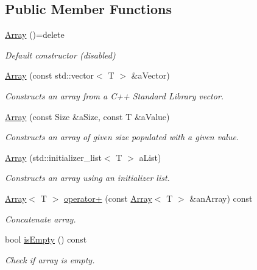 \subsection*{Public Member Functions}
\begin{DoxyCompactItemize}
\item 
\hyperlink{classlibrary_1_1core_1_1ctnr_1_1_array_a95de936b24bfdf0a5d24ef45df892ecf}{Array} ()=delete
\begin{DoxyCompactList}\small\item\em Default constructor (disabled) \end{DoxyCompactList}\item 
\hyperlink{classlibrary_1_1core_1_1ctnr_1_1_array_a9b510b4e2a3f9d4a324dfd0feba01285}{Array} (const std\+::vector$<$ T $>$ \&a\+Vector)
\begin{DoxyCompactList}\small\item\em Constructs an array from a C++ Standard Library vector. \end{DoxyCompactList}\item 
\hyperlink{classlibrary_1_1core_1_1ctnr_1_1_array_a647190cec3e259a8d8ad173c18bf3020}{Array} (const Size \&a\+Size, const T \&a\+Value)
\begin{DoxyCompactList}\small\item\em Constructs an array of given size populated with a given value. \end{DoxyCompactList}\item 
\hyperlink{classlibrary_1_1core_1_1ctnr_1_1_array_adcda1d4d28575b580a978406107febbb}{Array} (std\+::initializer\+\_\+list$<$ T $>$ a\+List)
\begin{DoxyCompactList}\small\item\em Constructs an array using an initializer list. \end{DoxyCompactList}\item 
\hyperlink{classlibrary_1_1core_1_1ctnr_1_1_array}{Array}$<$ T $>$ \hyperlink{classlibrary_1_1core_1_1ctnr_1_1_array_a5d65732e2a07b268d9def2da3c955002}{operator+} (const \hyperlink{classlibrary_1_1core_1_1ctnr_1_1_array}{Array}$<$ T $>$ \&an\+Array) const
\begin{DoxyCompactList}\small\item\em Concatenate array. \end{DoxyCompactList}\item 
bool \hyperlink{classlibrary_1_1core_1_1ctnr_1_1_array_a77d943be46a6d0313be3f2c5ca66d231}{is\+Empty} () const
\begin{DoxyCompactList}\small\item\em Check if array is empty. \end{DoxyCompactList}\item 

\end{DoxyCompactItemize}

